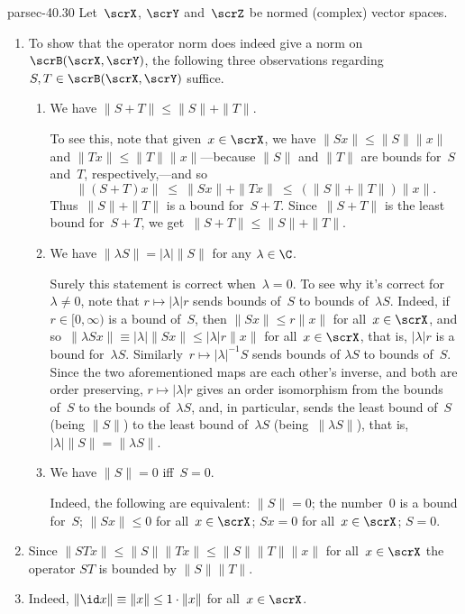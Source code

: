 \documentclass[b5page]{book}
\begin{document}
\begin{solution}{parsec-40.30}%
Let~$\scrX$, $\scrY$ and~$\scrZ$ be normed (complex) vector spaces.
\begin{enumerate}
\item
To show that the operator norm does indeed
give a norm on~$\scrB(\scrX,\scrY)$,
the following
three observations
regarding $S,T\in\scrB(\scrX,\scrY)$
suffice.
\begin{enumerate}
\item
We have $\|S+T\|\leq \|S\|+\|T\|$.

To see this,
note that
given~$x\in \scrX$,
we have $\|Sx\|\leq \|S\|\|x\|$
and $\|Tx\|\leq \|T\|\|x\|$---because $\|S\|$ and $\|T\|$ are bounds
for~$S$ and~$T$, respectively,---and so 
\begin{equation*}
    \|(S+T)x\|
\ \leq\  \|Sx\|+\|Tx\|
\ \leq\  (\|S\|+\|T\|)\|x\|.
\end{equation*}
Thus~$\|S\|+\|T\|$ is a bound for~$S+T$.
Since~$\|S+T\|$ is the least bound for~$S+T$,
we get~$\|S+T\|\leq \|S\|+\|T\|$.

\item
We have
$\|\lambda S\|=\left|\lambda \right| \|S\|$
for any $\lambda \in \C$.

Surely this statement is correct when~$\lambda= 0$.
To see why it's correct for~$\lambda \neq 0$,
note that
$r\mapsto \left|\lambda\right| r$
sends bounds of~$S$ to bounds of~$\lambda S$.
Indeed,
if~$r\in[0,\infty)$ is a bound of~$S$,
then $\|Sx\|\leq r\|x\|$
for all~$x\in \scrX$,
and so~$\|\lambda Sx\| \equiv 
\left|\lambda \right|\|Sx\|\leq \left|\lambda\right| r \|x\|$
for all~$x\in\scrX$,
that is, $\left|\lambda\right|r$
is a bound for~$\lambda S$.
Similarly~$r\mapsto \left|\lambda\right|^{-1} S$
sends bounds of $\lambda S$
to bounds of~$S$.
Since the two aforementioned maps are each other's inverse,
and both are order preserving,
$r\mapsto \left|\lambda \right|r$
gives an order isomorphism from 
the bounds of~$S$ to the bounds of~$\lambda S$,
and, in particular,
    sends the least bound of~$S$ (being $\|S\|$)
to the least bound of~$\lambda S$
        (being~$\|\lambda S\|$),
that is,
$\left|\lambda\right|\|S\|=\|\lambda S\|$.
\item
We have $\|S\|=0$ iff~$S=0$.

Indeed, the following are equivalent:
$\|S\|=0$; the number~$0$ is a bound for~$S$;
$\|Sx\|\leq 0$ for all~$x\in\scrX$;
$Sx=0$ for all~$x\in\scrX$;
$S=0$.
\end{enumerate}
\item
Since $\|STx\|\leq \|S\| \|Tx\|
\leq \|S\|\|T\|\|x\|$
for all~$x\in \scrX$
the operator $ST$ is bounded by
$\|S\|\|T\|$.
\item
Indeed, $ \|\id x \|\equiv \|x\|\leq  1\cdot\|x\|$
for all~$x\in\scrX$.
\end{enumerate}
\end{solution}
\end{document}
